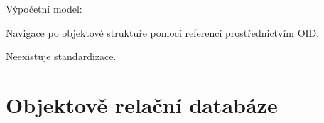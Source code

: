 \begin{compactitem}
    \item Výpočetní model: \begin{compactitem}
        \item Navigace po objektové struktuře pomocí referencí prostřednictvím OID.
    \end{compactitem}

    \item Neexistuje standardizace.
\end{compactitem}


\section{Objektově relační databáze}


